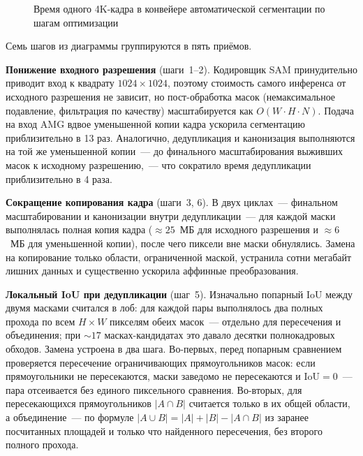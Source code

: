\begin{figure}[H]
\caption{Время одного 4K-кадра в конвейере автоматической сегментации по шагам
оптимизации}
\label{fig:auto_perf}
\end{figure}

Семь шагов из диаграммы группируются в пять приёмов.

\textbf{Понижение входного разрешения} (шаги~1--2). Кодировщик SAM
принудительно приводит вход к квадрату $1024 \times 1024$, поэтому стоимость
самого инференса от исходного разрешения не зависит, но пост-обработка масок
(немаксимальное подавление, фильтрация по качеству) масштабируется как
$O(W \cdot H \cdot N)$. Подача на вход AMG вдвое
уменьшенной копии кадра ускорила сегментацию приблизительно в 13 раз.
Аналогично, дедупликация и канонизация выполняются на той же уменьшенной
копии~--- до финального масштабирования выживших масок к исходному
разрешению,~--- что сократило время дедупликации приблизительно в 4 раза.

\textbf{Сокращение копирования кадра} (шаги~3, 6). В двух циклах~--- финальном
масштабировании и канонизации внутри дедупликации~--- для каждой маски
выполнялась полная копия кадра ($\approx 25$~МБ для исходного разрешения и
$\approx 6$~МБ для уменьшенной копии), после чего пиксели вне маски обнулялись.
Замена на копирование только области, ограниченной маской, устранила сотни
мегабайт лишних данных и существенно ускорила аффинные преобразования.

\textbf{Локальный IoU при дедупликации} (шаг~5). Изначально попарный IoU между
двумя масками считался в лоб: для каждой пары выполнялось два полных прохода
по всем $H \times W$ пикселям обеих масок~--- отдельно для пересечения и
объединения; при $\sim 17$ масках-кандидатах это давало десятки полнокадровых
обходов. Замена устроена в два шага. Во-первых, перед попарным сравнением
проверяется пересечение ограничивающих прямоугольников масок: если
прямоугольники не пересекаются, маски заведомо не пересекаются и
$\text{IoU} = 0$~--- пара отсеивается без единого пиксельного сравнения.
Во-вторых, для пересекающихся прямоугольников $|A \cap B|$ считается только в
их общей области, а объединение~--- по формуле
$|A \cup B| = |A| + |B| - |A \cap B|$ из заранее посчитанных площадей и только
что найденного пересечения, без второго полного прохода.

